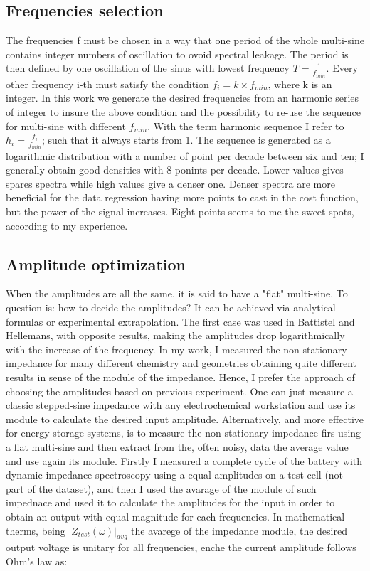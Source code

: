 \subsection{Frequencies selection}

The frequencies f must be chosen in a way that one period of the whole multi-sine contains integer numbers of oscillation to ovoid spectral leakage. 
The period is then defined by one oscillation of the sinus with lowest frequency $T=\frac{1}{f_{min}}$.
Every other frequency i-th must satisfy the condition $f_i=k\times f_{min}$, where k is an integer. 
In this work we generate the desired frequencies from an harmonic series of integer to insure the above condition and the possibility to re-use the sequence for multi-sine with different $f_{min}$. 
With the term harmonic sequence I refer to $h_i =\frac{f_i}{f_{min}}$; such that it always starts from 1. The sequence is generated as a logarithmic distribution with a number of point per decade between six and ten; I generally obtain good densities with 8 ponints per decade. 
Lower values gives spares spectra while high values give a denser one. 
Denser spectra are more beneficial for the data regression having more points to cast in the cost function, but the power of the signal increases. 
Eight points seems to me the sweet spots, according to my experience.

\subsection{Amplitude optimization}
\label{sec:amplitude optim}
When the amplitudes are all the same, it is said to have a "flat" multi-sine. 
To question is: how to decide the amplitudes?  It can be achieved via analytical formulas or experimental extrapolation. 
The first case was used in Battistel and Hellemans, with opposite results, making the amplitudes drop logarithmically with the increase of the frequency.  
In my work, I measured the non-stationary impedance for many different chemistry and geometries obtaining quite different results in sense of the module of the impedance. 
Hence, I prefer the approach of choosing the amplitudes based on previous experiment. 
One can just measure a classic stepped-sine impedance with any electrochemical workstation and use its module to calculate the desired input amplitude. 
Alternatively, and more effective for energy storage systems, is to measure the non-stationary impedance firs using a flat multi-sine and then extract from the, often noisy, data the average value and use again its module.
Firstly I measured a complete cycle of the battery with dynamic impedance spectroscopy using a equal amplitudes on a test cell (not part of the dataset), and then I used the avarage of the module of such impednace and used it to calculate the amplitudes for the input in order to obtain an output with equal magnitude for each frequencies. 
In mathematical therms, being $|Z_{test}(\omega)|_{avg}$ the avarege of the impedance module, the desired output voltage is unitary for all frequencies, enche the current amplitude follows Ohm's law as:

